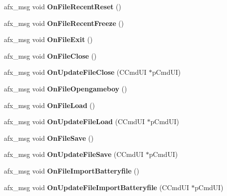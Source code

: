 \begin{DoxyCompactItemize}
afx\+\_\+msg void {\bfseries On\+File\+Recent\+Reset} ()
\item 
\mbox{\label{class_main_wnd_a7ea11eb4bb58a99c3aa2a39276c24864}} 
afx\+\_\+msg void {\bfseries On\+File\+Recent\+Freeze} ()
\item 
\mbox{\label{class_main_wnd_a61ca65c37ef1650dfc06de2c3e27891c}} 
afx\+\_\+msg void {\bfseries On\+File\+Exit} ()
\item 
\mbox{\label{class_main_wnd_abf162c1763ea3246bdac171847fb2d9d}} 
afx\+\_\+msg void {\bfseries On\+File\+Close} ()
\item 
\mbox{\label{class_main_wnd_a2a6f2246f0bced548c0267e1869896f4}} 
afx\+\_\+msg void {\bfseries On\+Update\+File\+Close} (C\+Cmd\+UI $\ast$p\+Cmd\+UI)
\item 
\mbox{\label{class_main_wnd_ad1cfc9f500a8049610e1b7bc4c5ce725}} 
afx\+\_\+msg void {\bfseries On\+File\+Opengameboy} ()
\item 
\mbox{\label{class_main_wnd_a50801b3ffe4aa323fdd654dc56e71d32}} 
afx\+\_\+msg void {\bfseries On\+File\+Load} ()
\item 
\mbox{\label{class_main_wnd_acb0b11e80174e75041bf222d5025e860}} 
afx\+\_\+msg void {\bfseries On\+Update\+File\+Load} (C\+Cmd\+UI $\ast$p\+Cmd\+UI)
\item 
\mbox{\label{class_main_wnd_a962abbb99f5b6bba3f05ba043358584e}} 
afx\+\_\+msg void {\bfseries On\+File\+Save} ()
\item 
\mbox{\label{class_main_wnd_a751b8875a072014c27ec1eb4648e03b9}} 
afx\+\_\+msg void {\bfseries On\+Update\+File\+Save} (C\+Cmd\+UI $\ast$p\+Cmd\+UI)
\item 
\mbox{\label{class_main_wnd_abea55fe16d21636d4c8704dd1fdfcfe9}} 
afx\+\_\+msg void {\bfseries On\+File\+Import\+Batteryfile} ()
\item 
\mbox{\label{class_main_wnd_a8495cabf7c5e45a773160b17a0555da7}} 
afx\+\_\+msg void {\bfseries On\+Update\+File\+Import\+Batteryfile} (C\+Cmd\+UI $\ast$p\+Cmd\+UI)

\end{DoxyCompactItemize}
